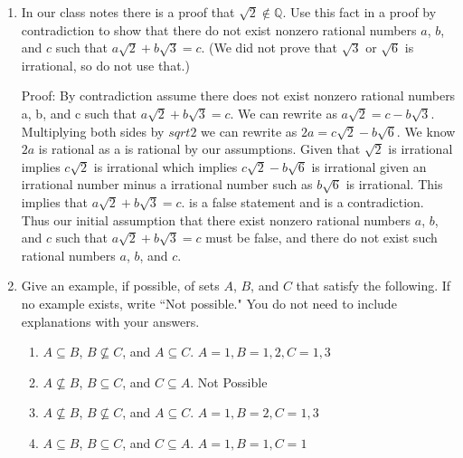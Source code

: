 \documentclass{article}
\newcommand{\bR}{\mathbb{R}}
\newcommand{\bQ}{\mathbb{Q}}
\begin{document}
{\begin{enumerate}[labelindent=0pt,leftmargin=0pt]
\begin{enumerate}
Lemma: For all $n\in\bR$ if $n \neq 0$ there there exists $a,k\in\bR$ such that $a\geq 0$, k is odd, and $n=x^a k$. 

Proof: Assume $\sqrt{x}$ is rational. 
Then there exist $m,n\in\bR$ with $n \neq 0$ such that $\sqrt{x} = m/n$
By the lemma, $m=x^a j$ and $n=2^b k$ for some $a,b,j,k\in\bR$ with $a,b\geq0$, and  j and k are odd.
Since $\sqrt{x} = m/n$ we have $x = (x^a j / x^b k)^2 = x^2a j^2 / x^2b k^2$,
which in turn shows that $x^(2b+1) k^2 = x^2a j^2$ Since 


\item Contrapose the implications in your proof from part (a) and
reverse their order to give a direct proof of the proposition. (Which
version of the proof is cleaner? (That is rhetorical.))




\end{enumerate}
\item In our class notes there is a proof that $\sqrt{2}\not\in\bQ$.
Use this fact in a proof by contradiction to show that there do not exist
nonzero rational numbers $a$, $b$, and $c$ such that
$a\sqrt{2}+b\sqrt{3}=c$. (We did not prove that $\sqrt{3}$ or $\sqrt{6}$
is irrational, so do not use that.)


Proof: By contradiction assume there does not exist nonzero rational numbers a, b, and c such that $a\sqrt{2} + b\sqrt{3} = c$.
We can rewrite as $a\sqrt{2} =c - b\sqrt{3}$.
Multiplying both sides by $sqrt{2}$ we can rewrite as 
$2a =c\sqrt{2} - b\sqrt{6}$.
We know$2a$ is rational as a is rational by our assumptions. 
Given that $\sqrt{2}$ is irrational implies $c\sqrt{2}$ is irrational which implies 
$c\sqrt{2} - b\sqrt{6}$ is irrational given an irrational number minus a irrational number such as $b\sqrt{6}$ is irrational. 
This implies that $a\sqrt{2} + b\sqrt{3} = c$. is a false statement and is a contradiction. 
Thus our initial assumption that there exist nonzero rational numbers $a$, $b$, and $c$ such that $a\sqrt{2} + b\sqrt{3} = c$ must be false, and there do not exist such rational numbers $a$, $b$, and $c$.







\item Give an example, if possible, of sets $A$, $B$, and $C$ that
satisfy the following. If no example exists, write ``Not possible." You do
not need to include explanations with your answers.
\begin{enumerate}
\item $A\subseteq B$, $B\not\subseteq C$, and $A\subseteq C$.
\subitem $A = {1}, B = {1, 2}, C = {1, 3}$
\item $A\not\subseteq B$, $B\subseteq C$, and $C\subseteq A$.
\subitem Not Possible
\item $A\not\subseteq B$, $B\not\subseteq C$, and $A\subseteq C$.
\subitem $A = {1}, B = {2}, C = {1, 3}$
\item $A\subseteq B$, $B\subseteq C$, and $C\subseteq A$.
\subitem $A = {1}, B = {1}, C = {1}$
\end{enumerate}
\end{enumerate}
}
\end{document}
